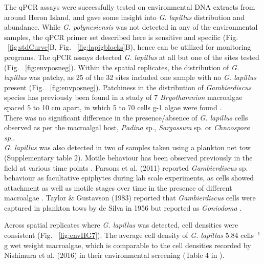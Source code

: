 \documentclass[12pt]{article}
\begin{document}
The qPCR assays were successfully tested on environmental DNA extracts from around Heron Island, and gave some insight into \emph{G. lapillus} distribution and abundance. While \emph{G. polynesiensis} was not detected in any of the environmental samples, the qPCR primer set described here is sensitive and specific (Fig. ~\ref{fig:stdCurve}B, Fig. ~\ref{fig:lapigblocks}B), hence can be utilized for monitoring programs.
The qPCR assays detected \emph{G. lapillus} at all but one of the sites tested (Fig. ~\ref{fig:envposneg}). Within the spatial replicates, the distribution of \emph{G. lapillus} was patchy, as 25 of the 32 sites included one sample with no \textit{G. lapillus} present (Fig. ~\ref{fig:envposneg}). Patchiness in the distribution of \textit{Gambierdiscus} species has previously been found in a study of 7 \emph{Bryothamnion} macroalgae spaced 5 to 10 cm apart, in which 5 to 70 cells g-1 algae were found \citep{taylor1986underwater}.\\
There was no significant difference in the presence/absence of \emph{G. lapillus} cells observed as per the macroalgal host, \emph{Padina} sp., \emph{Sargassum} sp. or \emph{Chnoospora sp.}.  \\
\emph{G. lapillus} was also detected in two of samples taken using a plankton net tow (Supplementary table 2). Motile behaviour has been observed previously in the field at various time points \citep{yasumoto1977finding,bomber1987ecology}. Parsons et al. (2011) reported \emph{Gambierdiscus} sp. behaviour as facultative epiphytes during lab scale experiments, as cells showed attachment as well as motile stages over time in the presence of different macroalgae \citep{parsons2011examination}. Taylor \& Gustavson (1983) reported that \emph{Gambierdiscus} cells were captured in plankton tows by de Silva in 1956 but reported as \emph{Goniodoma} \citep{taylor1986underwater}.

Across spatial replicates where \emph{G. lapillus} was detected, cell densities were consistent (Fig. ~\ref{fig:envHG7}). The average cell density of \emph{G. lapillus} 5.84 cells$^{-1}$g wet weight macroalgae, which is comparable to the cell densities recorded by Nishimura et al. (2016) in their environmental screening (Table 4 in \citep{nishimura2016quantitative}).\\
\end{document}
